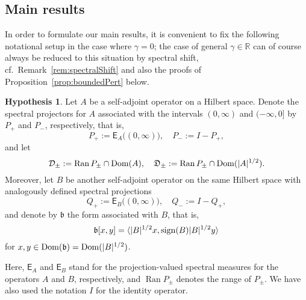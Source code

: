 \documentclass[11pt,a4paper]{amsart}
\numberwithin{equation}{section}
\DeclareMathOperator{\Ran}{Ran}
\DeclareMathOperator{\Dom}{Dom}
\DeclareMathOperator{\sign}{sign}
\DeclarePairedDelimiter{\abs}{|}{|}
\DeclarePairedDelimiter{\scprod}{\langle}{\rangle}
\newcommand{\RR}{\mathbb{R}}
\newcommand{\EE}{\mathsf{E}}
\newcommand{\cD}{{\mathcal D}}
\newcommand{\fb}{{\mathfrak b}}
\newcommand{\fD}{{\mathfrak D}}
\theoremstyle{plain}
\theoremstyle{definition}
\newtheorem{hypothesis}[theorem]{Hypothesis}
\theoremstyle{remark}
\begin{document}
\subsection*{Main results}
In order to formulate our main results, it is convenient to fix the following notational setup in the case where $\gamma = 0$;
the case of general $\gamma \in \RR$ can of course always be reduced to this situation by spectral shift,
cf.~Remark~\ref{rem:spectralShift} and also the proofs of Proposition~\ref{prop:boundedPert} below.

\begin{hypothesis}\label{hyp:minimax}
  Let $A$ be a self-adjoint operator on a Hilbert space. Denote the spectral projectors for $A$ associated with the intervals
  $(0,\infty)$ and $(-\infty,0]$ by $P_+$ and $P_-$, respectively, that is,
  \begin{equation*}
    P_+ := \EE_A\bigl((0,\infty)\bigr)
    ,\quad
    P_- := I-P_+
    ,
  \end{equation*}
  and let
  \begin{equation*}
    \cD_\pm := \Ran P_\pm \cap \Dom(A)
    ,\quad
    \fD_\pm := \Ran P_\pm \cap \Dom(\abs{A}^{1/2})
    .
  \end{equation*}
  Moreover, let $B$ be another self-adjoint operator on the same Hilbert space with analogously defined spectral projections
  \begin{equation*}
    Q_+ := \EE_B\bigl((0,\infty)\bigr)
    ,\quad
    Q_- := I - Q_+
    ,
  \end{equation*}
  and denote by $\fb$ the form associated with $B$, that is,
  \begin{equation*}
    \fb[x,y] = \scprod{ \abs{B}^{1/2}x , \sign(B)\abs{B}^{1/2}y }
  \end{equation*}
  for $x,y\in\Dom(\fb) = \Dom(\abs{B}^{1/2})$.
\end{hypothesis}

Here, $\EE_A$ and $\EE_B$ stand for the projection-valued spectral measures for the operators $A$ and $B$, respectively, and
$\Ran P_\pm$ denotes the range of $P_\pm$. We have also used the notation $I$ for the identity operator.
\end{document}
